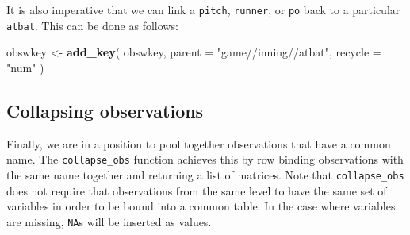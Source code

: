\documentclass[12pt,]{isuthesis}
\newenvironment{Shaded}{\begin{snugshade}}{\end{snugshade}}
\newcommand{\KeywordTok}[1]{\textcolor[rgb]{0.13,0.29,0.53}{\textbf{{#1}}}}
\newcommand{\DataTypeTok}[1]{\textcolor[rgb]{0.13,0.29,0.53}{{#1}}}
\newcommand{\StringTok}[1]{\textcolor[rgb]{0.31,0.60,0.02}{{#1}}}
\newcommand{\NormalTok}[1]{{#1}}
\begin{document}
It is also imperative that we can link a \texttt{pitch},
\texttt{runner}, or \texttt{po} back to a particular \texttt{atbat}.
This can be done as follows:

\begin{Shaded}
\begin{Highlighting}[]
\NormalTok{obswkey <-}\StringTok{ }\KeywordTok{add_key}\NormalTok{(}
  \NormalTok{obswkey, }\DataTypeTok{parent =} \StringTok{"game//inning//atbat"}\NormalTok{, }\DataTypeTok{recycle =} \StringTok{"num"}
\NormalTok{)}
\end{Highlighting}
\end{Shaded}

\subsection{Collapsing observations}\label{collapsing-observations}

Finally, we are in a position to pool together observations that have a
common name. The \texttt{collapse\_obs} function achieves this by row
binding observations with the same name together and returning a list of
matrices. Note that \texttt{collapse\_obs} does not require that
observations from the same level to have the same set of variables in
order to be bound into a common table. In the case where variables are
missing, \texttt{NA}s will be inserted as values.
\end{document}
